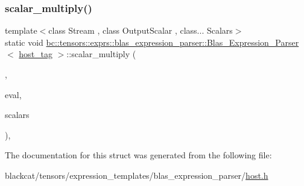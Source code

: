 \mbox{\label{structbc_1_1tensors_1_1exprs_1_1blas__expression__parser_1_1Blas__Expression__Parser_3_01host__tag_01_4_a2481598673f239189642a2f3a7c33c68}} 
\subsubsection{\texorpdfstring{scalar\+\_\+multiply()}{scalar\_multiply()}\hspace{0.1cm}{\footnotesize\ttfamily [2/2]}}
{\footnotesize\ttfamily template$<$class Stream , class Output\+Scalar , class... Scalars$>$ \\
static void \hyperlink{structbc_1_1tensors_1_1exprs_1_1blas__expression__parser_1_1Blas__Expression__Parser}{bc\+::tensors\+::exprs\+::blas\+\_\+expression\+\_\+parser\+::\+Blas\+\_\+\+Expression\+\_\+\+Parser}$<$ \hyperlink{structbc_1_1host__tag}{host\+\_\+tag} $>$\+::scalar\+\_\+multiply (\begin{DoxyParamCaption}\item[{\hyperlink{classbc_1_1streams_1_1Stream}{Stream}}]{,  }\item[{Output\+Scalar $\ast$}]{eval,  }\item[{Scalars...}]{scalars }\end{DoxyParamCaption})\hspace{0.3cm}{\ttfamily [inline]}, {\ttfamily [static]}}



The documentation for this struct was generated from the following file\+:\begin{DoxyCompactItemize}
\item 
blackcat/tensors/expression\+\_\+templates/blas\+\_\+expression\+\_\+parser/\hyperlink{tensors_2expression__templates_2blas__expression__parser_2host_8h}{host.\+h}\end{DoxyCompactItemize}
